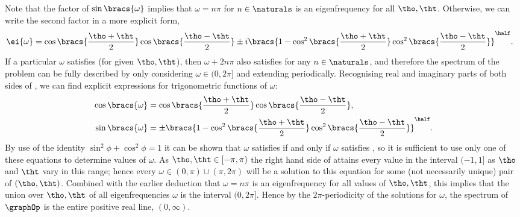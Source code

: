 Note that the factor of $\sin\bracs{\omega}$ implies that $\omega=n\pi$ for $n\in\naturals$ is an eigenfrequency for all $\tho,\tht$. Otherwise, we can write the second factor in a more explicit form,
\begin{align} \label{eq:GraphODEOmSol2}
	\ei{\omega} &= \cos\bracs{\frac{\tho+\tht}{2}}\cos\bracs{\frac{\tho-\tht}{2}} \pm i\bracs{1-\cos^{2}\bracs{\frac{\tho+\tht}{2}}\cos^{2}\bracs{\frac{\tho-\tht}{2}}}^{\half}.
\end{align}
If a particular $\omega$ satisfies  (for given $\tho, \tht$), then $\omega+2n\pi$ also satisfies  for any $n\in\naturals$, and therefore the spectrum of the problem  can be fully described by only considering $\omega\in(0, 2\pi]$ and extending periodically.
Recognising real and imaginary parts of both sides of , we can find explicit expressions for trigonometric functions of $\omega$:
\begin{subequations} \label{eq:ClassicalKirchhoffOmegaEquations}
\begin{align}
	\cos\bracs{\omega} &= \cos\bracs{\frac{\tho+\tht}{2}}\cos\bracs{\frac{\tho-\tht}{2}}, \label{eq:ClassKirchhoffOmEq1}\\
	\sin\bracs{\omega} &= \pm\bracs{1-\cos^{2}\bracs{\frac{\tho+\tht}{2}}\cos^{2}\bracs{\frac{\tho-\tht}{2}}}^{\half}. \label{eq:ClassKirchhoffOmEq2}
\end{align}
\end{subequations}
By use of the identity $\sin^{2}\phi + \cos^{2}\phi = 1$ it can be shown that $\omega$ satisfies  if and only if $\omega$ satisfies , so it is sufficient to use only one of these equations to determine values of $\omega$.
As $\tho,\tht\in[-\pi,\pi)$ the right hand side of  attains every value in the interval $(-1,1]$ as $\tho$ and $\tht$ vary in this range; hence every $\omega\in(0,\pi)\cup(\pi,2\pi)$ will be a solution to this equation for some (not necessarily unique) pair of $(\tho,\tht)$.
Combined with the earlier deduction that $\omega=n\pi$ is an eigenfrequency for all values of $\tho,\tht$, this implies that the union over $\tho,\tht$ of all eigenfrequencies $\omega$ is the interval $(0,2\pi]$.
Hence by the $2\pi$-periodicity of the solutions for $\omega$, the spectrum of $\graphOp$ is the entire positive real line, $(0,\infty)$. \newline

